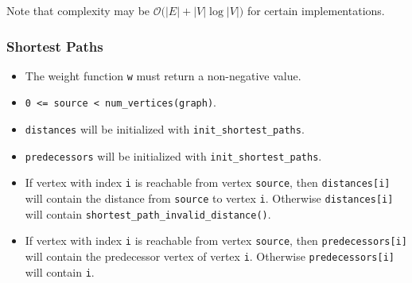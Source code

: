 Note that complexity may be $\mathcal{O}(|E| + |V|\log{|V|)}$ for certain implementations.

\subsubsection{Shortest Paths}
{\small
      
}

\begin{itemdescr}
      \pnum\mandates
            \begin{itemize}
                  \item
                        The weight function \lstinline{w} must return a non-negative value.
            \end{itemize}
      \pnum\preconditions
            \begin{itemize}
                  \item
                        \lstinline{0 <= source < num_vertices(graph)}. 
                  \item
                        \lstinline{distances} will be initialized with \lstinline{init_shortest_paths}.
                  \item
                        \lstinline{predecessors} will be initialized with \lstinline{init_shortest_paths}.
            \end{itemize}
      \pnum\effects
            \begin{itemize}
                  \item
                        If vertex with index \lstinline{i} is reachable from vertex \lstinline{source}, then
                        \lstinline{distances[i]} will contain the distance from \lstinline{source} to vertex
                        \lstinline{i}.  Otherwise \lstinline{distances[i]} will contain
                        \lstinline{shortest_path_invalid_distance()}.
                  \item
                        If vertex with index \lstinline{i} is reachable
                        from vertex \lstinline{source}, then \lstinline{predecessors[i]} will contain the
                        predecessor vertex of vertex \lstinline{i}. Otherwise \lstinline{predecessors[i]} will contain
                        \lstinline{i}.
            \end{itemize}
      \pnum\throws 
            \begin{itemize}

\end{itemize}
\end{itemdescr}
